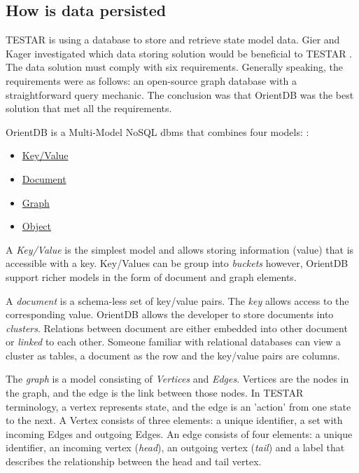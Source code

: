 \subsection{How is data persisted}

    TESTAR is using a database to store and retrieve state model data. Gier and Kager investigated which data storing solution would be beneficial to TESTAR \cite{GierKager}. The data solution must comply with six requirements. Generally speaking, the requirements were as follows: an open-source graph database with a straightforward query mechanic. The conclusion was that OrientDB was the best solution that met all the requirements. 
    
    OrientDB is a Multi-Model NoSQL \acrfull{dbms} that combines four models: \cite{orientDbModeling}:
   \begin{samepage}
        \begin{itemize}
            \item \hyperlink{db:key-value}{Key/Value}
            \item \hyperlink{db:document}{Document}
            \item \hyperlink{db:graph}{Graph}
            \item \hyperlink{db:object}{Object}
        \end{itemize}
    \end{samepage}

    A \hypertarget{db:key-value}{\emph{Key/Value}} is the simplest model and allows storing information (value) that is accessible with a key. Key/Values can be group into \textit{buckets} however, OrientDB support richer models in the form of document and graph elements. 

    A \hypertarget{db:document}{\emph{document}} is a schema-less set of key/value pairs. The \emph{key} allows access to the corresponding value. OrientDB allows the developer to store documents into \emph{clusters}. Relations between document are either embedded into other document or \emph{linked} to each other. Someone familiar with relational databases can view a cluster as tables, a document as the row and the key/value pairs are columns. 
    
    The \hypertarget{db:graph}{\emph{graph}} is a model consisting of \emph{Vertices} and \emph{Edges}. Vertices are the nodes in the graph, and the edge is the link between those nodes. In TESTAR terminology, a vertex represents state, and the edge is an 'action' from one state to the next. A Vertex consists of three elements: a unique identifier, a set with incoming Edges and outgoing Edges. An edge consists of four elements: a unique identifier, an incoming vertex (\emph{head}), an outgoing vertex (\emph{tail}) and a label that describes the relationship between the head and tail vertex. 

